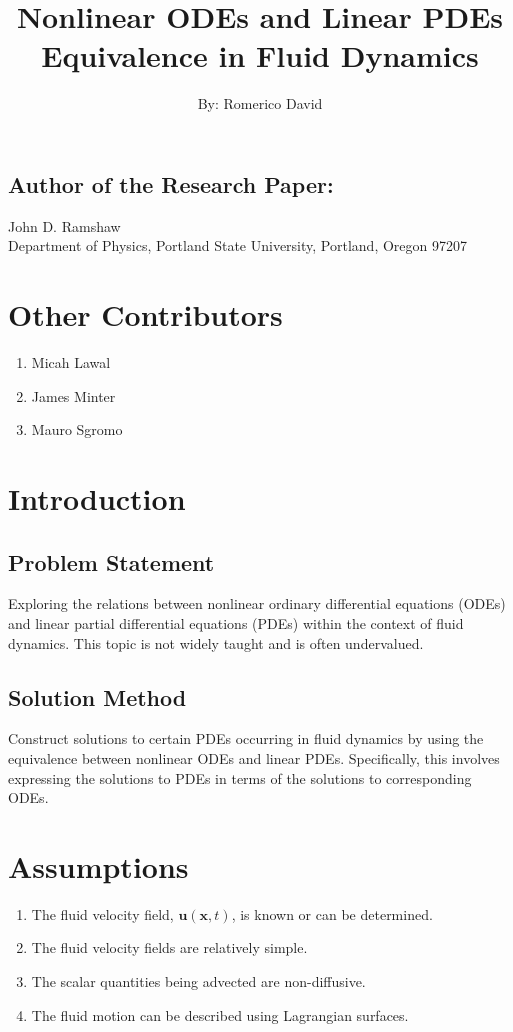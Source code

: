 \documentclass{article}
\title{Nonlinear ODEs and Linear PDEs Equivalence in Fluid Dynamics}
\author{By: Romerico David}
\date{}
\begin{document}
\maketitle

\begin{center}
\section*{Author of the Research Paper:}
John D. Ramshaw\\
Department of Physics, Portland State University, Portland, Oregon 97207
\end{center}

\section*{Other Contributors}
\begin{enumerate}
    \item Micah Lawal
    \item James Minter
    \item Mauro Sgromo
\end{enumerate}



\section{Introduction}

\subsection{Problem Statement}
Exploring the relations between nonlinear ordinary differential equations (ODEs) and linear partial differential equations (PDEs) within the context of fluid dynamics. This topic is not widely taught and is often undervalued.

\subsection{Solution Method}
Construct solutions to certain PDEs occurring in fluid dynamics by using the equivalence between nonlinear ODEs and linear PDEs. Specifically, this involves expressing the solutions to PDEs in terms of the solutions to corresponding ODEs.

\section{Assumptions}
\begin{enumerate}
    \item The fluid velocity field, $\mathbf{u}(\mathbf{x}, t)$, is known or can be determined.
    \item The fluid velocity fields are relatively simple.
    \item The scalar quantities being advected are non-diffusive.
    \item The fluid motion can be described using Lagrangian surfaces.
\end{enumerate}
\end{document}
